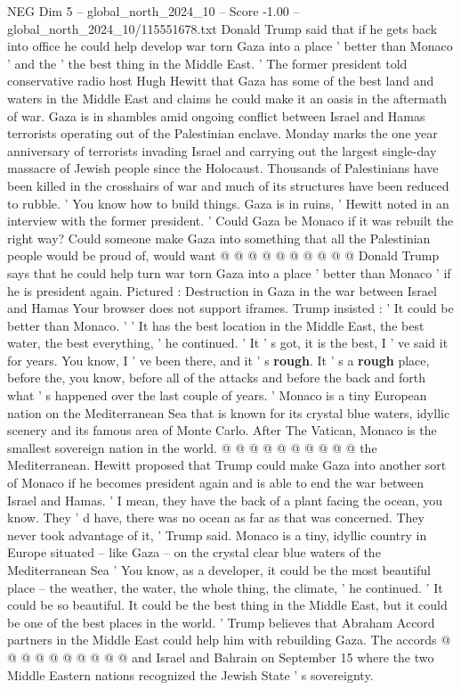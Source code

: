 \begin{textsample}{NEG Dim 5 – global\_north\_2024\_10 – Score -1.00 – global\_north\_2024\_10/115551678.txt}  \label{ex:f5_neg_052}
Donald Trump said that if he gets back into office he could help develop war torn Gaza into a place ' better than Monaco ' and the ' the best thing in the Middle East. ' The former president told conservative radio host Hugh Hewitt that Gaza has some of the best land and waters in the Middle East and claims he could make it an oasis in the aftermath of war.
Gaza is in shambles amid ongoing conflict between Israel and Hamas terrorists operating out of the Palestinian enclave.
Monday marks the one year anniversary of terrorists invading Israel and carrying out the largest single-day massacre of Jewish people since the Holocaust.
Thousands of Palestinians have been killed in the crosshairs of war and much of its structures have been reduced to rubble. ' You know how to build things.
Gaza is in ruins, ' Hewitt noted in an interview with the former president. ' Could Gaza be Monaco if it was rebuilt the right way?
Could someone make Gaza into something that all the Palestinian people would be proud of, would want @ @ @ @ @ @ @ @ @ @ Donald Trump says that he could help turn war torn Gaza into a place ' better than Monaco ' if he is president again.
Pictured : Destruction in Gaza in the war between Israel and Hamas Your browser does not support iframes.
Trump insisted : ' It could be better than Monaco. ' ' It has the best location in the Middle East, the best water, the best everything, ' he continued. ' It ' s got, it is the best, I ' ve said it for years.
You know, I ' ve been there, and it ' s \textbf{rough}.
It ' s a \textbf{rough} place, before the, you know, before all of the attacks and before the back and forth what ' s happened over the last couple of years. ' Monaco is a tiny European nation on the Mediterranean Sea that is known for its crystal blue waters, idyllic scenery and its famous area of Monte Carlo.
After The Vatican, Monaco is the smallest sovereign nation in the world. @ @ @ @ @ @ @ @ @ @ the Mediterranean.
Hewitt proposed that Trump could make Gaza into another sort of Monaco if he becomes president again and is able to end the war between Israel and Hamas. ' I mean, they have the back of a plant facing the ocean, you know.
They ' d have, there was no ocean as far as that was concerned.
They never took advantage of it, ' Trump said.
Monaco is a tiny, idyllic country in Europe situated -- like Gaza -- on the crystal clear blue waters of the Mediterranean Sea ' You know, as a developer, it could be the most beautiful place -- the weather, the water, the whole thing, the climate, ' he continued. ' It could be so beautiful.
It could be the best thing in the Middle East, but it could be one of the best places in the world. ' Trump believes that Abraham Accord partners in the Middle East could help him with rebuilding Gaza.
The accords @ @ @ @ @ @ @ @ @ @ and Israel and Bahrain on September 15 where the two Middle Eastern nations recognized the Jewish State ' s sovereignty.

\end{textsample}
